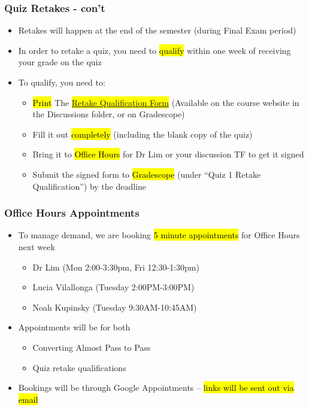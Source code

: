\begin{frame}
\frametitle{Quiz Retakes - con't}
    \begin{itemize}
        \item Retakes will happen at the end of the semester (during Final Exam period)
        \item In order to retake a quiz, you need to \hl{qualify} within one week of receiving your grade on the quiz
        \item To qualify, you need to:
        \begin{itemize}
            \item \hl{Print} The \hl{\href{https://learn.bu.edu/ultra/courses/_246685_1/outline/file/_16630786_1}{Retake Qualification Form}} (Available on the course website in the Discussions folder, or on Gradescope)
            \item Fill it out \hl{completely} (including the blank copy of the quiz)
            \item Bring it to \hl{Office Hours} for Dr Lim or your discussion TF to get it signed
            \item Submit the signed form to \hl{Gradescope} (under ``Quiz 1 Retake Qualification'') by the deadline
        \end{itemize}
    \end{itemize}
\end{frame}

\begin{frame}
    \frametitle{Office Hours Appointments}
    \begin{itemize}
        \item To manage demand, we are booking \hl{5 minute appointments} for Office Hours next week
        \begin{itemize}
            \item Dr Lim (Mon 2:00-3:30pm, Fri 12:30-1:30pm)
            \item Lucia Vilallonga (Tuesday 2:00PM-3:00PM)
            \item Noah Kupinsky (Tuesday 9:30AM-10:45AM)
        \end{itemize}
        \item Appointments will be for both
        \begin{itemize}
            \item Converting Almost Pass to Pass
            \item Quiz retake qualifications
        \end{itemize}
        \item Bookings will be through Google Appointments -- \hl{links will be sent out via email}
    \end{itemize}
\end{frame}